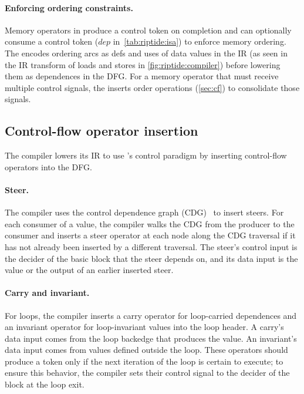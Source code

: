 \paragraph{Enforcing ordering constraints.} 
Memory operators in \riptide 
produce a control token on completion and can optionally consume a
control token ($dep$ in~\autoref{tab:riptide:isa}) to enforce memory ordering.
%
The \mend encodes ordering arcs as defs and uses of data values in the IR
(as seen in the IR transform of loads and stores in \autoref{fig:riptide:compiler})
before lowering them as dependences in the DFG.
%
For a memory operator that must receive multiple control signals,
the \mend inserts order operations (\autoref{sec:cf}) to consolidate those signals.

\subsection{Control-flow operator insertion}

The compiler lowers its IR to use \riptide's control paradigm by inserting \riptide
control-flow operators into the DFG.
%

\paragraph{Steer.}
%
The compiler uses the control dependence graph (CDG)~\cite{cytron} to 
insert steers.
%
For each consumer of a value, the compiler walks the CDG from the producer
to the consumer
and inserts a steer operator at
each node along the CDG traversal if it has not already been inserted by a different traversal. 
%
% 
The steer's control input is the decider of the basic block that the steer depends on,
and its data input is the value or the output of an earlier inserted steer.
%

\paragraph{Carry and invariant.}
%
For loops, the compiler inserts a carry operator for loop-carried dependences
and an invariant operator for loop-invariant values
into the loop header.
%
A carry's data
input comes from the loop backedge that produces the value.  An invariant's
data input comes from values defined outside the loop.
%
These operators should produce a token only if the next iteration of the loop is
certain to execute; to ensure this behavior, the compiler sets their control
signal to the decider of the block at the loop exit. 
%

